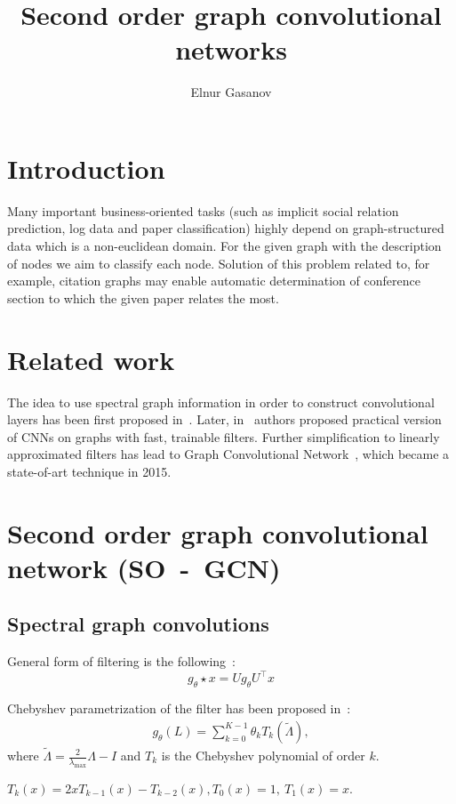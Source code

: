 \documentclass{article}
\title{Second order graph convolutional networks}
\date{}
\author{Elnur Gasanov}
\begin{document}
\maketitle

\section{Introduction}

Many important business-oriented tasks (such as implicit social relation prediction, log data and paper classification) highly depend on graph-structured data which is a non-euclidean domain. For the given graph with the description of nodes we aim to classify each node. Solution of this problem related to, for example, citation graphs may enable automatic determination of conference section to which the given paper relates the most.

\section{Related work}

The idea to use spectral graph information in order to construct convolutional layers has been first proposed in~\cite{first_paper}. Later, in~\cite{CNN_LSF} authors proposed practical version of CNNs on graphs with fast, trainable filters. Further simplification to linearly approximated filters has lead to Graph Convolutional Network~\cite{GCN}, which became a state-of-art technique in 2015. 
\section{Second order graph convolutional network (SO~-~GCN)}
\subsection{Spectral graph convolutions}

General form of filtering is the following~\cite{first_paper}:
\[
g_\theta \star x = Ug_\theta U^\top x 
\]

Chebyshev parametrization of the filter has been proposed in~\cite{CNN_LSF}:
\begin{align}
g_\theta(L) = \sum\limits_{k=0}^{K-1} \theta_k T_k(\tilde{\Lambda}), \label{eq}
\end{align}
where $\tilde{\Lambda} = \frac{2}{\lambda_{\max}} \Lambda - I$ and  $T_k$ is the Chebyshev polynomial of order $k$. 

$T_k(x) = 2 x T_{k-1}(x) - T_{k-2}(x), T_0(x) = 1, \ T_1(x) = x$. 
\end{document}

